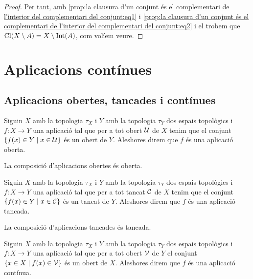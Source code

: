 \documentclass[../Apunts.tex]{subfiles}
\begin{document}
\begin{proposition}
\begin{proof}
			Per tant, amb \eqref{prop:la clausura d'un conjunt és el complementari de l'interior del complementari del conjunt:eq1} i \eqref{prop:la clausura d'un conjunt és el complementari de l'interior del complementari del conjunt:eq2} i el  trobem que \(\operatorname{Cl}(X\setminus A)=X\setminus\operatorname{Int}(A)\), com volíem veure.
		\end{proof}
	\end{proposition}
	\section{Aplicacions contínues}
	\subsection{Aplicacions obertes, tancades i contínues}
	\begin{definition}
		\label{def:aplicació oberta}
		Siguin \(X\) amb la topologia \(\tau_{X}\) i \(Y\) amb la topologia \(\tau_{Y}\) dos espais topològics i \(f\colon X\longrightarrow Y\) una aplicació tal que per a tot obert \(\mathcal{U}\) de \(X\) tenim que el conjunt \(\{f(x)\in Y\mid x\in\mathcal{U}\}\) és un obert de \(Y\). Aleshores direm que \(f\) és una aplicació oberta.
	\end{definition}
	\begin{observation}
		\label{obs:la composició d'aplicacions obertes és oberta}
		La composició d'aplicacions obertes és oberta.
	\end{observation}
	\begin{definition}
		\label{def:aplicació tancada}
		Siguin \(X\) amb la topologia \(\tau_{X}\) i \(Y\) amb la topologia \(\tau_{Y}\) dos espais topològics i \(f\colon X\longrightarrow Y\) una aplicació tal que per a tot tancat \(\mathcal{C}\) de \(X\) tenim que el conjunt \(\{f(x)\in Y\mid x\in\mathcal{C}\}\) és un tancat de \(Y\). Aleshores direm que \(f\) és una aplicació tancada.
	\end{definition}
	\begin{observation}
		\label{obs:la composició d'aplicacions tancades és tancada}
		La composició d'aplicacions tancades és tancada.
	\end{observation}
	\begin{definition}
		\label{def:aplicació contínua}
		Siguin \(X\) amb la topologia \(\tau_{X}\) i \(Y\) amb la topologia \(\tau_{Y}\) dos espais topològics i \(f\colon X\longrightarrow Y\) una aplicació tal que per a tot obert \(\mathcal{V}\) de \(Y\) el conjunt \(\{x\in X\mid f(x)\in\mathcal{V}\}\) és un obert de \(X\). Aleshores direm que \(f\) és una aplicació contínua.
	\end{definition}
\end{document}
